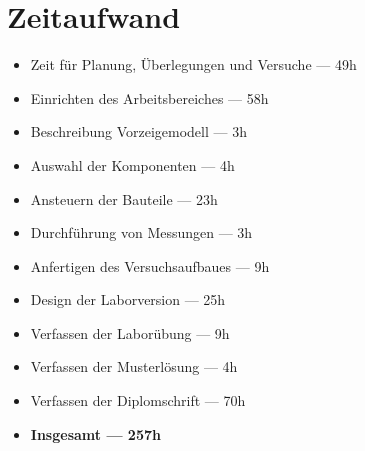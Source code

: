 \chapter*{Zeitaufwand}

\begin{itemize}
    \item Zeit für Planung, Überlegungen und Versuche --- 49h
    \item Einrichten des Arbeitsbereiches --- 58h
    \item Beschreibung Vorzeigemodell --- 3h
    \item Auswahl der Komponenten --- 4h
    \item Ansteuern der Bauteile --- 23h
    \item Durchführung von Messungen --- 3h
    \item Anfertigen des Versuchsaufbaues --- 9h
    \item Design der Laborversion --- 25h
    \item Verfassen der Laborübung --- 9h
    \item Verfassen der Musterlösung --- 4h
    \item Verfassen der Diplomschrift --- 70h
    \item \textbf{Insgesamt --- 257h}
\end{itemize}